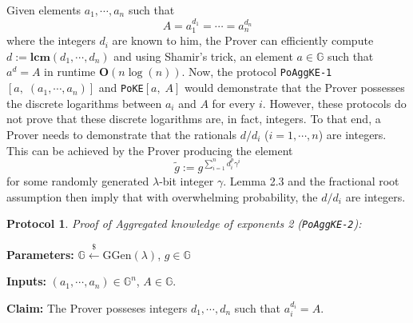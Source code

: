 \documentclass[11pt, lettersize, notitlepage, leqno, footskip=0.6cm]{article}
\newcommand{\slim}{\sum\limits}
\newcommand{\wti}{\widetilde}
\newcommand{\mb}{\mathbb}
\newcommand{\mbf}{\mathbf}
\newcommand{\mr}{\mathrm}
\newcommand{\lam}{\lambda}
\newcommand{\lamb}{\lambda}
\newcommand{\vs}{\vspace{-0.15cm}}
\newcommand{\noin}{\noindent}
\newcommand{\LCM}{\mbf{lcm}}
\newtheorem{Prot}[Thm]{Protocol}
\numberwithin{equation}{section}
\begin{document}
\noin Given elements $a_1,\cdots,a_n$ such that \vs $$A = a_1^{d_1} =\cdots = a_n^{d_n} $$ where the integers $d_i$ are known to him, the Prover can efficiently compute $d:= \LCM(d_1,\cdots,d_n)$ and  using Shamir's trick, an element $a\in\mb{G}$ such that $a^d = A$ in runtime $\mbf{O}(n\log(n))$. Now, the protocol \verb|PoAggKE-1|$[a,\;(a_1,\cdots,a_n)]$ and \verb|PoKE|$[a,\;A]$ would demonstrate that the Prover possesses the discrete logarithms between $a_i$ and $A$ for every $i$. However, these protocols do not prove that these discrete logarithms are, in fact, integers. To that end, a Prover needs to demonstrate that the rationals $d/d_i$ ($i=1,\cdots, n$) are integers. This can be achieved by the Prover producing the element \vs $$\wti{g} := g^{\slim_{i=1}^{n}d_i^{p}\gamma^i} $$ for some randomly generated $\lam$-bit integer $\gamma$. Lemma 2.3 and the fractional root assumption then imply that with overwhelming probability, the $d/d_i$ are integers.

\vspace{0.2cm}

\begin{Prot} \normalfont \textit{Proof of Aggregated knowledge of exponents} 2 (\verb|PoAggKE-2|): \end{Prot}\vspace{-0.25cm}

\noindent \textbf{Parameters:} $\mb{G}\xleftarrow{\$} \mr{GGen}(\lamb)$,\; $g\in \mb{G}$ 

\noindent \textbf{Inputs:} $(a_1,\cdots,a_n) \in \mb{G}^n$, $A\in\mb{G}$.

\noindent \textbf{Claim:} The Prover posseses integers $d_1,\cdots,d_n$ such that $a_i^{d_i} = A$.
\end{document}

